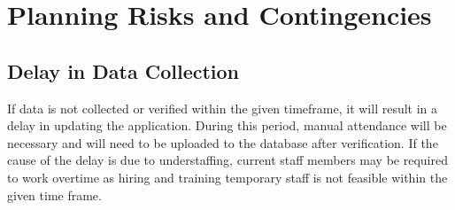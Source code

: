 \documentclass{scrreprt}
\begin{document}
\chapter{Planning Risks and Contingencies}
\section{Delay in Data Collection}
If data is not collected or verified within the given timeframe, it will result in a delay in updating the application. During this period, manual attendance will be necessary and will need to be uploaded to the database after verification.
If the cause of the delay is due to understaffing, current staff members may be required to work overtime as hiring and training temporary staff is not feasible within the given time frame.
\end{document}
